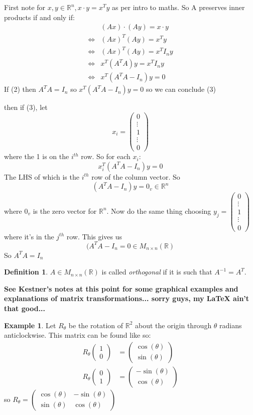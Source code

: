 \documentclass{report}
\theoremstyle{remark}
\theoremstyle{definition}
\newtheorem{definition}[theorem]{Definition}
\theoremstyle{definition}
\newtheorem{example}[theorem]{Example}
\theoremstyle{theorem}
\begin{document}
First note for $x, y \in \mathbb{R}^n, x\cdot y = x^Ty$ as per intro to maths. So A preserves inner products if and only if:
\begin{align*}
    &(Ax) \cdot(Ay) = x\cdot y\\
    \iff & (Ax)^T(Ay)=x^Ty\\
    \iff & (Ax)^T(Ay) = x^TI_ny \\
    \iff & x^T(A^TA)y=x^T I_ny\\
    \iff & x^T(A^TA-I_n)y = 0
\end{align*}
If (2) then $A^TA=I_n$ so $x^T(A^TA-I_n)y=0$ so we can conclude (3) \par
then if (3), let
\[x_i = \begin{pmatrix} 0\\ \vdots\\ 1 \\ \vdots\\ 0 \end{pmatrix} \] where the 1 is on the $i^{th}$ row. So for each $x_i$:
\[x_i^T(A^TA-I_n)y=0\]
The LHS of which is the $i^{th}$ row of the column vector. So
\[(A^TA-I_n)y = 0_v \in \mathbb{R}^n \] where $0_v$ is the zero vector for $\mathbb{R}^n$. Now do the same thing choosing $y_j= \begin{pmatrix} 0 \\ \vdots \\ 1 \\ \vdots \\ 0 \end{pmatrix}$ where it's in the $j^{th}$ row. This gives us
    \[(A^TA-I_n = 0 \in M_{n \times n}(\mathbb{R})\]
So $A^TA = I_n$
\begin{definition}
$A \in M_{n \times n}(\mathbb{R})$ is called \emph{orthogonal} if it is such that $A^{-1} = A^T$.
\end{definition}
\textbf{See Kestner's notes at this point for some graphical examples and explanations of matrix transformations... sorry guys, my \LaTeX{} ain't that good...}
\begin{example}
Let $R_\theta$ be the rotation of $\mathbb{R}^2$ about the origin through $\theta$ radians anticlockwise. This matrix can be found like so:
\begin{align*}
    R_\theta \begin{pmatrix}1\\0 \end{pmatrix} &= \begin{pmatrix} \cos(\theta) \\ \sin(\theta) \end{pmatrix}\\
    R_\theta \begin{pmatrix}0\\1 \end{pmatrix} &= \begin{pmatrix} -\sin(\theta) \\ \cos(\theta) \end{pmatrix}
\end{align*}
so $R_\theta = \begin{pmatrix} \cos(\theta) &-\sin(\theta) \\ \sin(\theta) & \cos(\theta) \end{pmatrix}$
\end{example}
\end{document}
